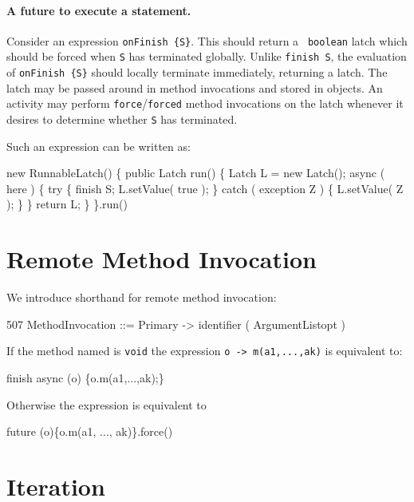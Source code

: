 
\paragraph{A future to execute a statement.}
Consider an expression {\tt onFinish \{S\}}. This should return a {\tt
boolean} latch which should be forced when {\tt S} has terminated
globally. Unlike {\tt finish S}, the evaluation of {\tt onFinish
\{S\}} should locally terminate immediately, returning a latch. The
latch may be passed around in method invocations and stored in
objects. An activity may perform {\tt force}/{\tt forced} method
invocations on the latch whenever it desires to determine whether {\tt S}
has terminated.

Such an expression can be written as:
\begin{x10}
  new RunnableLatch() \{
      public Latch run() \{
         Latch L = new Latch();
         async ( here ) \{
            try \{
                finish S;
                L.setValue( true );
            \} catch ( exception Z ) \{
                 L.setValue( Z );
            \}
         \}
         return L;
      \}
    \}.run()
\end{x10}

\section{Remote Method Invocation}
We introduce shorthand for remote method invocation:

\begin{x10}
507   MethodInvocation ::= 
        Primary -> identifier ( ArgumentListopt )
\end{x10}

If the method named is {\tt void} the expression {\tt o -> m(a1,...,ak)}
is equivalent to:
\begin{x10}
 finish async (o) \{o.m(a1,...,ak);\}
\end{x10}

Otherwise the expression is equivalent to
\begin{x10}
 future (o)\{o.m(a1, ..., ak)\}.force()
\end{x10}

\section{Iteration}\label{ForLoop}
\label{ForAllLoop}

